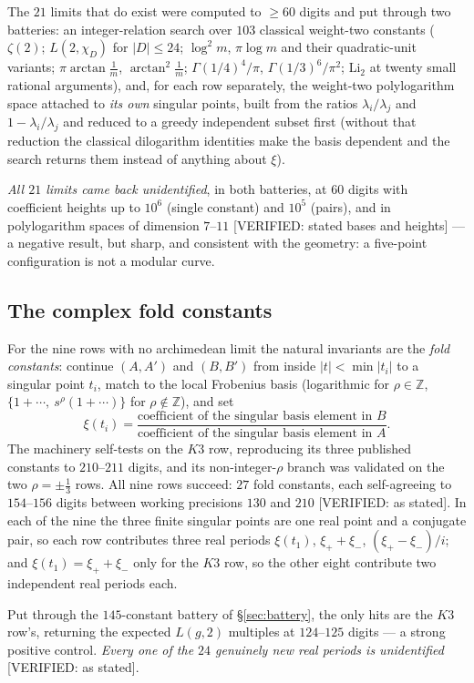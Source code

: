 \documentclass[11pt,reqno]{amsart}
\theoremstyle{plain}
\theoremstyle{definition}
\theoremstyle{remark}
\theoremstyle{plain}
\newcommand{\Z}{\mathbb{Z}}
\newcommand{\Verified}[1]{\textup{\textsf{[VERIFIED: #1]}}}
\begin{document}
The $21$ limits that do exist were computed to $\ge60$ digits and put through two
batteries: an integer-relation search over $103$ classical weight-two constants
($\zeta(2)$; $L(2,\chi_D)$ for $|D|\le24$; $\log^2m$, $\pi\log m$ and their
quadratic-unit variants; $\pi\arctan\frac1m$, $\arctan^2\frac1m$;
$\Gamma(1/4)^4/\pi$, $\Gamma(1/3)^6/\pi^2$; $\mathrm{Li}_2$ at twenty small
rational arguments), and, for each row separately, the weight-two polylogarithm
space attached to \emph{its own} singular points, built from the ratios
$\lambda_i/\lambda_j$ and $1-\lambda_i/\lambda_j$ and reduced to a greedy
independent subset first (without that reduction the classical dilogarithm
identities make the basis dependent and the search returns them instead of
anything about $\xi$).

\emph{All $21$ limits came back unidentified}, in both batteries, at $60$ digits
with coefficient heights up to $10^6$ (single constant) and $10^5$ (pairs), and
in polylogarithm spaces of dimension $7$--$11$ \Verified{stated bases and
heights} --- a negative result, but sharp, and consistent with the geometry: a
five-point configuration is not a modular curve.

\subsection{The complex fold constants}\label{sec:folds}
For the nine rows with no archimedean limit the natural invariants are the
\emph{fold constants}: continue $(A,A')$ and $(B,B')$ from inside
$|t|<\min|t_i|$ to a singular point $t_i$, match to the local Frobenius basis
(logarithmic for $\rho\in\Z$, $\{1+\cdots,\ s^\rho(1+\cdots)\}$ for
$\rho\notin\Z$), and set
\[
\xi(t_i)=\frac{\text{coefficient of the singular basis element in }B}
              {\text{coefficient of the singular basis element in }A}.
\]
The machinery self-tests on the $K3$ row, reproducing its three published
constants to $210$--$211$ digits, and its non-integer-$\rho$ branch was validated
on the two $\rho=\pm\tfrac13$ rows. All nine rows succeed: $27$ fold constants,
each self-agreeing to $154$--$156$ digits between working precisions $130$ and
$210$ \Verified{as stated}. In each of the nine the three finite singular points
are one real point and a conjugate pair, so each row contributes three real
periods $\xi(t_1)$, $\xi_++\xi_-$, $(\xi_+-\xi_-)/i$; and $\xi(t_1)=\xi_++\xi_-$
only for the $K3$ row, so the other eight contribute two independent real periods
each.

Put through the $145$-constant battery of \S\ref{sec:battery}, the only hits are
the $K3$ row's, returning the expected $L(g,2)$ multiples at $124$--$125$ digits
--- a strong positive control. \emph{Every one of the $24$ genuinely new real
periods is unidentified} \Verified{as stated}.
\end{document}
